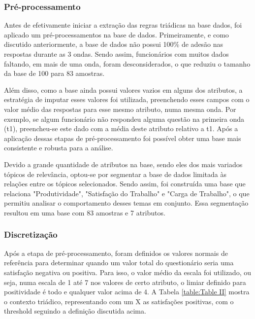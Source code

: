 \documentclass[kdmile,a4paper]{kdmile} %
\begin{document}
\subsubsection{Pré-processamento}
Antes de efetivamente iniciar a extração das regras triádicas na base dados, foi aplicado um pré-processamentos na base de dados. Primeiramente, e como discutido anteriormente, a base de dados não possui 100\% de adesão nas respostas durante as 3 ondas. Sendo assim, funcionários com muitos dados faltando, em mais de uma onda, foram desconsiderados, o que reduziu o tamanho da base de 100 para 83 amostras. 

Além disso, como a base ainda possui valores vazios em alguns dos atributos, a estratégia de imputar esses valores foi utilizada, preenchendo esses campos com o valor médio das respostas para esse mesmo atributo, numa mesma onda. Por exemplo, se algum funcionário não respondeu alguma questão na primeira onda (t1), preencheu-se este dado com a média deste atributo relativo a t1. Após a aplicação dessas etapas de pré-processamento foi possível obter uma base mais consistente e robusta para a análise.

Devido a grande quantidade de atributos na base, sendo eles dos mais variados tópicos de relevância, optou-se por segmentar a base de dados limitada às relações entre os tópicos selecionados. Sendo assim, foi construída uma base que relaciona "Produtividade", "Satisfação do Trabalho" e "Carga de Trabalho", o que permitiu analisar o comportamento desses temas em conjunto. Essa segmentação resultou em uma base com 83 amostras e 7 atributos.

\subsubsection{Discretização}

Após a etapa de pré-processamento, foram definidos os valores normais de referência para determinar quando um valor total do questionário seria uma satisfação negativa ou positiva. Para isso, o valor médio da escala foi utilizado, ou seja, numa escala de 1 até 7 nos valores de certo atributo, o limiar definido para positividade é todo e qualquer valor acima de 4. A Tabela \ref{table:Table II} mostra o contexto triádico, representando com um X as satisfações positivas, com o threshold seguindo a definição discutida acima.
\end{document}
